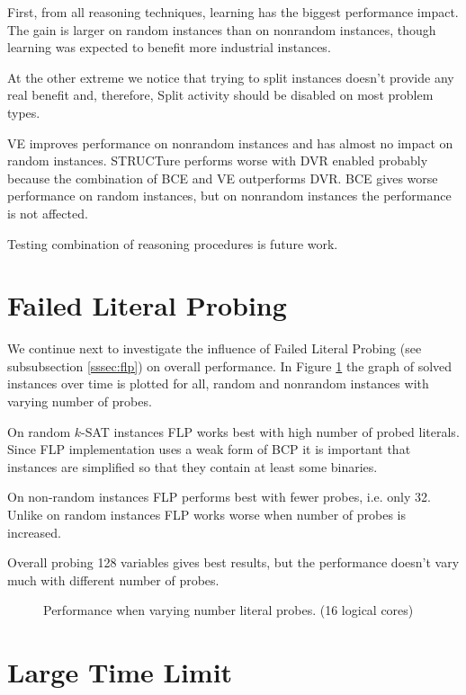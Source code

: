 First, from all reasoning techniques, learning has the biggest performance
impact. The gain is larger on random instances than on nonrandom
instances, though learning was expected to benefit more industrial
instances\cite{DBLP:series/faia/SilvaLM09}.

At the other extreme we notice that trying to split instances doesn't
provide any real benefit and, therefore, Split activity should be disabled
on most problem types.

VE improves performance on nonrandom instances and has almost no
impact on random instances. STRUCTure performs worse with DVR
enabled probably because the combination of BCE and VE outperforms
DVR. BCE gives worse performance on random instances, but on
nonrandom instances the performance is not affected.

Testing combination of reasoning procedures is future work.


\section{Failed Literal Probing}

We continue next to investigate the influence of Failed
Literal Probing (see subsubsection \ref{sssec:flp}) on overall
performance. In Figure \ref{fig:flp} the graph of solved instances
over time is plotted for all, random and nonrandom instances with
varying number of probes.

On random $k$-SAT instances FLP works best with high number of
probed literals. Since FLP implementation uses a weak form of BCP
it is important that instances are simplified so that they contain
at least some binaries.

On non-random instances FLP performs best with fewer probes,
i.e. only 32.  Unlike on random instances FLP works worse when
number of probes is increased.

Overall probing 128 variables gives best results, but the performance
doesn't vary much with different number of probes.

\begin{figure}
  \centering
  \caption{Performance when varying number literal probes. (16 logical cores)}
  \label{fig:flp}
\end{figure}


\section{Large Time Limit}

